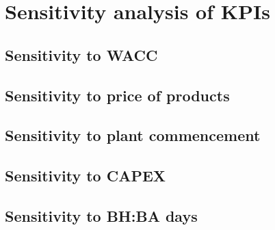 \section{Sensitivity analysis of KPIs}
\subsection{Sensitivity to WACC}
\subsection{Sensitivity to price of products}
\subsection{Sensitivity to plant commencement}
\subsection{Sensitivity to CAPEX}
\subsection{Sensitivity to BH:BA days}
